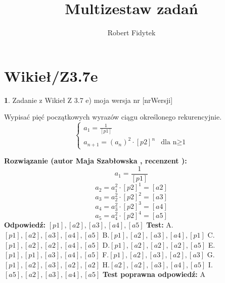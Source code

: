 \documentclass[12pt, a4paper]{article}
\title{Multizestaw zadań}
\author{Robert Fidytek}
\date{}
\theoremstyle{definition} %
\newtheorem{zad}{}
\newcommand{\kategoria}[1]{\section{#1}} %
\newcommand{\zadStart}[1]{\begin{zad}#1\newline} %
\newcommand{\zadStop}{\end{zad}}   %
\newcommand{\rozwStart}[2]{\noindent \textbf{Rozwiązanie (autor #1 , recenzent #2): }\newline} %
\newcommand{\rozwStop}{\newline}                                            %
\newcommand{\odpStart}{\noindent \textbf{Odpowiedź:}\newline}    %
\newcommand{\odpStop}{\newline}                                             %
\newcommand{\testStart}{\noindent \textbf{Test:}\newline} %
\newcommand{\testStop}{\newline} %
\newcommand{\kluczStart}{\noindent \textbf{Test poprawna odpowiedź:}\newline} %
\newcommand{\kluczStop}{\newline} %
\begin{document}
\maketitle


\kategoria{Wikieł/Z3.7e}
\zadStart{Zadanie z Wikieł Z 3.7 e)  moja wersja nr [nrWersji]}

Wypisać pięć początkowych wyrazów ciągu określonego rekurencyjnie.
$$\left\{ \begin{array}{ll}
a_{1}=\frac{1}{[p1]}\\
a_{n+1}=(a_{n})^{2}\cdot[p2]^{n}& \textrm{dla n$\geq$1} 
\end{array} \right.
$$
\zadStop
\rozwStart{Maja Szabłowska}{}
$$a_{1}=\frac{1}{[p1]}$$
$$a_{2}=a_{1}^{2}\cdot [p2]^{1}=[a2]$$
$$a_{3}=a_{2}^{2}\cdot [p2]^{2}=[a3]$$
$$a_{4}=a_{3}^{2}\cdot [p2]^{3}=[a4]$$
$$a_{5}=a_{4}^{2}\cdot [p2]^{4}=[a5]$$
\rozwStop
\odpStart
$[p1],[a2],[a3],[a4],[a5]$
\odpStop
\testStart
A.$[p1],[a2],[a3],[a4],[a5]$
B.$[p1],[a2],[a3],[a4],[p1]$
C.$[p1],[a2],[a2],[a4],[a5]$
D.$[p1],[a2],[a2],[a2],[a5]$
E.$[p1],[p1],[a3],[a4],[a5]$
F.$[p1],[a2],[a3],[a2],[a3]$
G.$[p1],[a2],[a3],[a2],[a2]$
H.$[a2],[a2],[a3],[a4],[a5]$
I.$[a5],[a2],[a3],[a4],[a5]$
\testStop
\kluczStart
A
\kluczStop
\end{document}

